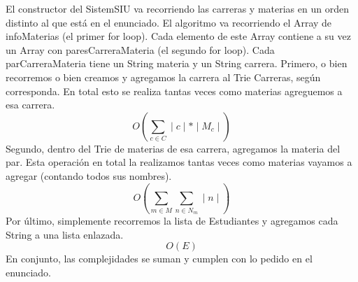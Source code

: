 \documentclass[10pt,a4paper]{article}
\begin{document}
El constructor del SistemSIU va recorriendo las carreras y materias en un orden distinto al que está
en el enunciado. El algoritmo va recorriendo el Array de infoMaterias (el primer for loop).
Cada elemento de este Array contiene a su vez un Array con paresCarreraMateria (el segundo for loop).
\smallskip
Cada parCarreraMateria tiene un String materia y un String carrera.
Primero, o bien recorremos o bien creamos y agregamos la carrera al Trie Carreras, según corresponda.
En total esto se realiza tantas veces como materias agreguemos a esa carrera.
\begin{equation}
	O(\sum_{c\in C}^{}\mid c\mid * \mid M_{c}\mid )
\end{equation}
Segundo, dentro del Trie de materias de esa carrera, agregamos la materia del par.
Esta operación en total la realizamos tantas veces como materias vayamos a agregar (contando todos sus nombres).\\
\begin{equation}
	O(\sum_{m\in M}^{}\sum_{n\in N_{m}}^{}\mid n\mid)
\end{equation}
Por último, simplemente recorremos la lista de Estudiantes y agregamos cada String a una lista enlazada.
\begin{equation}
	O(E)
\end{equation}
En conjunto, las complejidades se suman y cumplen con lo pedido en el enunciado.
\end{document}
